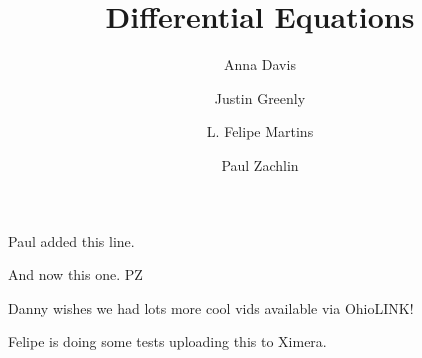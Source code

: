 \documentclass{article}
\author{Anna Davis \and Justin Greenly \and L. Felipe Martins \and Paul Zachlin}
\title{Differential Equations}
\begin{document}
\maketitle

Paul added this line.

And now this one.  PZ

Danny wishes we had lots more cool vids available via OhioLINK!

Felipe is doing some tests uploading this to Ximera.
\end{document}
